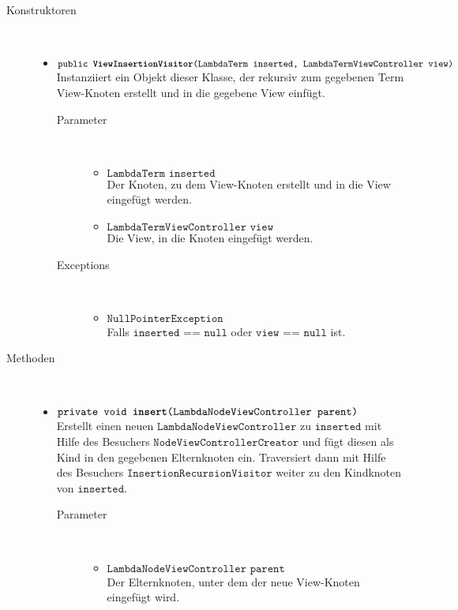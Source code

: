 \begin{description}
\item[Konstruktoren] \hfill \\
	\vspace{-.8cm}
	\begin{itemize}
		\item $\texttt{public \textbf{ViewInsertionVisitor}(LambdaTerm inserted, LambdaTermViewController view)}$ \\ Instanziiert ein Objekt dieser Klasse, der rekursiv zum gegebenen Term View-Knoten erstellt und in die gegebene View einfügt.
		\begin{description}
			\item[Parameter] \hfill \\
			\vspace{-.8cm}
			\begin{itemize}
				\item $\texttt{LambdaTerm inserted}$ \\ Der Knoten, zu dem View-Knoten erstellt und in die View eingefügt werden.
				\item $\texttt{LambdaTermViewController view}$ \\ Die View, in die Knoten eingefügt werden.
			\end{itemize}
			\item[Exceptions] \hfill \\
			\vspace{-.8cm}
			\begin{itemize}
				\item $\texttt{NullPointerException}$ \\ Falls $\texttt{inserted == null}$ oder $\texttt{view == null}$ ist.
			\end{itemize}
		\end{description}
	\end{itemize}

\item[Methoden] \hfill \\
	\vspace{-.8cm}
	\begin{itemize}
		\item $\texttt{private void \textbf{insert}(LambdaNodeViewController parent)}$ \\ Erstellt einen neuen $\texttt{LambdaNodeViewController}$ zu $\texttt{inserted}$ mit Hilfe des Besuchers $\texttt{NodeViewControllerCreator}$ und fügt diesen als Kind in den gegebenen Elternknoten ein. Traversiert dann mit Hilfe des Besuchers $\texttt{InsertionRecursionVisitor}$ weiter zu den Kindknoten von $\texttt{inserted}$.
		\begin{description}
			\item[Parameter] \hfill \\
			\vspace{-.8cm}
			\begin{itemize}
				\item $\texttt{LambdaNodeViewController parent}$ \\ Der Elternknoten, unter dem der neue View-Knoten eingefügt wird.
			\end{itemize}
		\end{description}
	

\end{itemize}
\end{description}
